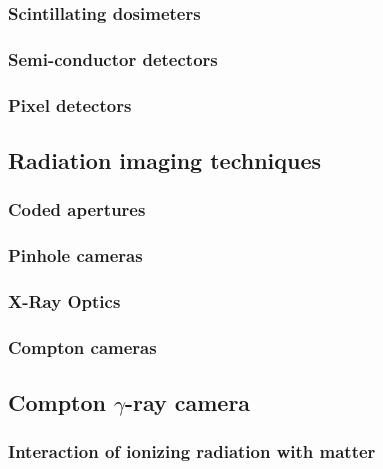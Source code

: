 \documentclass[a4paper,11pt,titlepage,twoside]{article}
\begin{document}

\subsubsection*{Scintillating dosimeters}

\subsubsection*{Semi-conductor detectors}

\subsubsection*{Pixel detectors}


\subsection{Radiation imaging techniques}


\subsubsection*{Coded apertures}

\subsubsection*{Pinhole cameras}

\subsubsection*{X-Ray Optics}

\subsubsection*{Compton cameras}



\subsection{Compton $\gamma$-ray camera}


\subsubsection{Interaction of ionizing radiation with matter}
\end{document}
